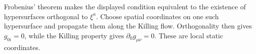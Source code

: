\begin{enumerate}[leftmargin=2.8em,itemsep=1.2em]
Frobenius' theorem makes the displayed condition equivalent to the existence
of hypersurfaces orthogonal to \(\xi^a\).  Choose spatial coordinates on one
such hypersurface and propagate them along the Killing flow.  Orthogonality
then gives \(g_{0i}=0\), while the Killing property gives
\(\partial_0g_{\mu\nu}=0\).  These are local static coordinates.
\end{enumerate}
